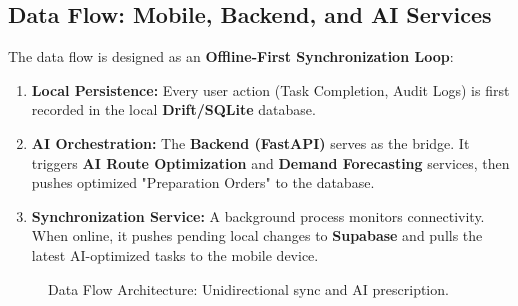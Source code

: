 \documentclass{article}
\begin{document}
\subsection{Data Flow: Mobile, Backend, and AI Services}
The data flow is designed as an \textbf{Offline-First Synchronization Loop}:
\begin{enumerate}
    \item \textbf{Local Persistence:} Every user action (Task Completion, Audit Logs) is first recorded in the local \textbf{Drift/SQLite} database.
    \item \textbf{AI Orchestration:} The \textbf{Backend (FastAPI)} serves as the bridge. It triggers \textbf{AI Route Optimization} and \textbf{Demand Forecasting} services, then pushes optimized "Preparation Orders" to the database.
    \item \textbf{Synchronization Service:} A background process monitors connectivity. When online, it pushes pending local changes to \textbf{Supabase} and pulls the latest AI-optimized tasks to the mobile device.
\end{enumerate}

\begin{figure}[h]
    \centering
    \caption{Data Flow Architecture: Unidirectional sync and AI prescription.}
\end{figure}
\end{document}
